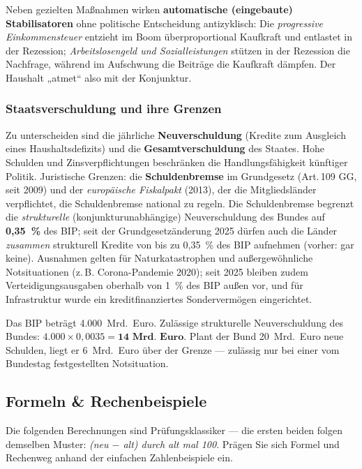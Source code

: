 \documentclass[11pt, a4paper]{article}
\begin{document}
Neben gezielten Maßnahmen wirken \textbf{automatische (eingebaute) Stabilisatoren} ohne
politische Entscheidung antizyklisch: Die \emph{progressive Einkommensteuer} entzieht im
Boom überproportional Kaufkraft und entlastet in der Rezession; \emph{Arbeitslosengeld und
Sozialleistungen} stützen in der Rezession die Nachfrage, während im Aufschwung die
Beiträge die Kaufkraft dämpfen. Der Haushalt „atmet`` also mit der Konjunktur.

\subsubsection{Staatsverschuldung und ihre Grenzen}

Zu unterscheiden sind die jährliche \textbf{Neuverschuldung} (Kredite zum Ausgleich eines
Haushaltsdefizits) und die \textbf{Gesamtverschuldung} des Staates. Hohe Schulden und
Zinsverpflichtungen beschränken die Handlungsfähigkeit künftiger Politik. Juristische
Grenzen: die \textbf{Schuldenbremse} im Grundgesetz (Art.\,109 GG, seit 2009) und der
\emph{europäische Fiskalpakt} (2013), der die Mitgliedsländer verpflichtet, die
Schuldenbremse national zu regeln. Die Schuldenbremse begrenzt die \emph{strukturelle}
(konjunkturunabhängige) Neuverschuldung des Bundes auf \textbf{0,35~\%} des BIP; seit der
Grundgesetzänderung 2025 dürfen auch die Länder \emph{zusammen} strukturell Kredite von
bis zu 0,35~\% des BIP aufnehmen (vorher: gar keine). Ausnahmen gelten für
Naturkatastrophen und außergewöhnliche Notsituationen (z.\,B. Corona-Pandemie 2020);
seit 2025 bleiben zudem Verteidigungsausgaben oberhalb von 1~\% des BIP außen vor, und für
Infrastruktur wurde ein kreditfinanziertes Sondervermögen eingerichtet.

\begin{beispiel}
Das BIP beträgt 4.000~Mrd.~Euro. Zulässige strukturelle Neuverschuldung des Bundes:
$4.000 \times 0{,}0035 = \textbf{14~Mrd.~Euro}$. Plant der Bund 20~Mrd.~Euro neue
Schulden, liegt er 6~Mrd.~Euro über der Grenze --- zulässig nur bei einer vom Bundestag
festgestellten Notsituation.
\end{beispiel}

\subsection{Formeln \& Rechenbeispiele}

Die folgenden Berechnungen sind Prüfungsklassiker --- die ersten beiden folgen demselben
Muster: \emph{(neu $-$ alt) durch alt mal 100}. Prägen Sie sich Formel und Rechenweg
anhand der einfachen Zahlenbeispiele ein.
\end{document}
